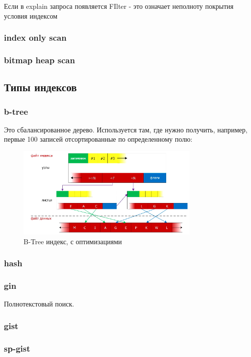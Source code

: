 Если в explain запроса появляется FIlter - это означает неполноту покрытия условия индексом 
\subsubsection{index only scan}
\subsubsection{bitmap heap scan}

\subsection{Типы индексов}

\subsubsection{b-tree}
Это сбалансированное дерево.
Используется там, где нужно получить, например, первые 100 записей отсортированные по определенному полю:
\begin{figure}[h!]
\centering
\includegraphics[width=0.8\textwidth]{img/btree.png}
\caption{B-Tree индекс, с оптимизациями}
\label{btree}
\end{figure}

\subsubsection{hash}
\subsubsection{gin}
Полнотекстовый поиск.
\subsubsection{gist}
\subsubsection{sp-gist}
